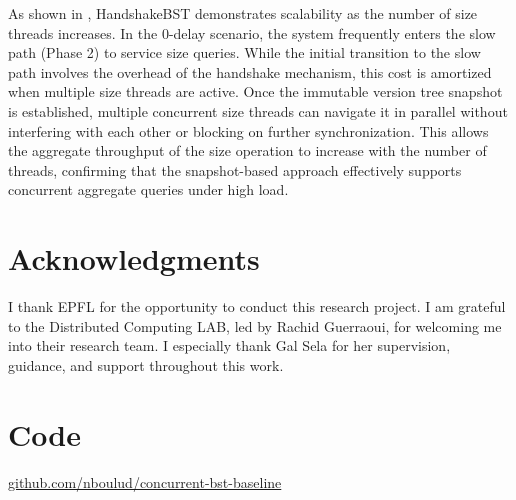 \documentclass[acmsmall,screen,nonacm]{acmart}
\begin{document}
As shown in , HandshakeBST demonstrates scalability as the number of size threads increases. In the 0-delay scenario, the system frequently enters the slow path (Phase 2) to service size queries. While the initial transition to the slow path involves the overhead of the handshake mechanism, this cost is amortized when multiple size threads are active. Once the immutable version tree snapshot is established, multiple concurrent size threads can navigate it in parallel without interfering with each other or blocking on further synchronization. This allows the aggregate throughput of the size operation to increase with the number of threads, confirming that the snapshot-based approach effectively supports concurrent aggregate queries under high load.


\section*{Acknowledgments}

I thank EPFL for the opportunity to conduct this research project. I am grateful to the Distributed Computing LAB, led by Rachid Guerraoui, for welcoming me into their research team. I especially thank Gal Sela for her supervision, guidance, and support throughout this work.

\section*{Code}


\href{https://github.com/nboulud/concurrent-bst-baseline/tree/main/Code}{github.com/nboulud/concurrent-bst-baseline}



\end{document}
